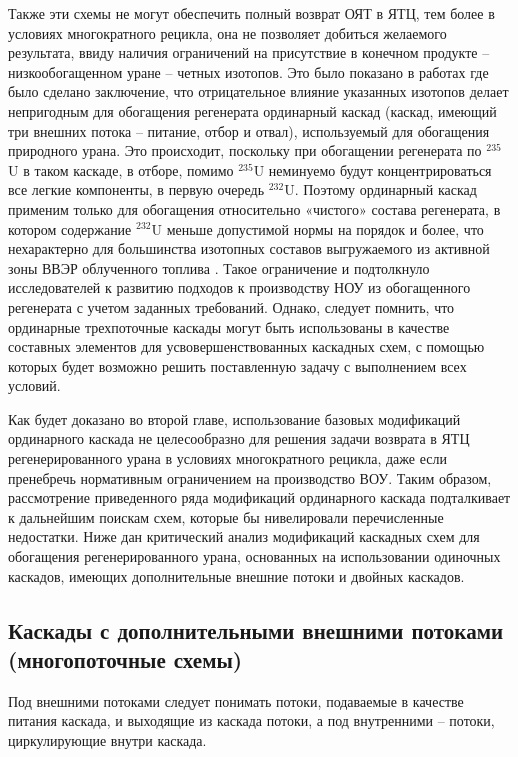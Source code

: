 Также эти схемы не могут обеспечить полный возврат ОЯТ в ЯТЦ, тем более в условиях многократного рецикла, она не позволяет добиться желаемого результата, ввиду наличия ограничений на присутствие в конечном продукте -- низкообогащенном уране -- четных изотопов.
Это было показано в работах \cite{sulaberidzeNekotoryhRazdelitelnyhProblemah2004,sulaberidzeProblemsRefinementRecycled4, smirnovKaskadnyeShemyZadachah2012} где было сделано заключение, что отрицательное влияние указанных изотопов делает непригодным для обогащения регенерата ординарный каскад (каскад, имеющий три внешних потока – питание, отбор и отвал), используемый для обогащения природного урана. Это происходит, поскольку при обогащении регенерата по $^{235}$U в таком каскаде, в отборе, помимо $^{235}$U неминуемо будут концентрироваться все легкие компоненты, в первую очередь $^{232}$U. Поэтому ординарный каскад применим только для обогащения относительно «чистого» состава регенерата, в котором содержание $^{232}$U меньше допустимой нормы на порядок и более, что нехарактерно для большинства изотопных составов выгружаемого из активной зоны ВВЭР облученного топлива \cite{bormanTehnikoekonomicheskiyAnalizVozmozhnyh2012}. Такое ограничение и подтолкнуло исследователей к развитию подходов к производству НОУ из обогащенного регенерата с учетом заданных требований. Однако, следует помнить, что ординарные трехпоточные каскады могут быть использованы в качестве составных элементов для усвовершенствованных каскадных схем, с помощью которых будет возможно решить поставленную задачу с выполнением всех условий.

Как будет доказано во второй главе, использование базовых модификаций ординарного каскада не целесообразно для решения задачи возврата в ЯТЦ регенерированного урана в условиях многократного рецикла, даже если пренебречь нормативным ограничением на производство ВОУ.
Таким образом, рассмотрение приведенного ряда модификаций ординарного каскада подталкивает к дальнейшим поискам схем, которые бы нивелировали перечисленные недостатки.
Ниже дан критический анализ модификаций каскадных схем для обогащения регенерированного урана, основанных на использовании одиночных каскадов, имеющих дополнительные внешние потоки и двойных каскадов.

\subsection{Каскады с дополнительными внешними потоками (многопоточные схемы)}

Под внешними потоками следует понимать потоки, подаваемые в качестве питания каскада, и выходящие из каскада потоки, а под внутренними -- потоки, циркулирующие внутри каскада. 

